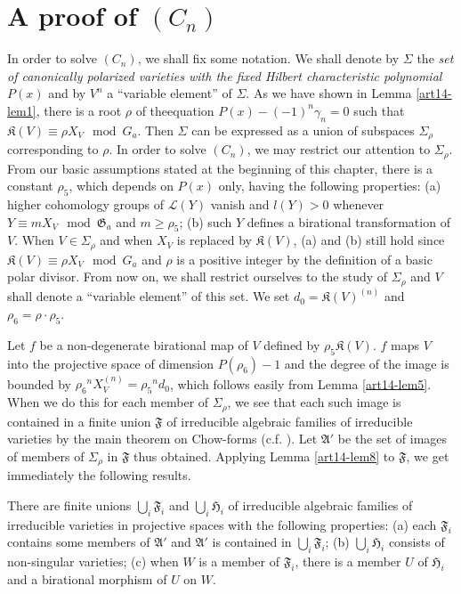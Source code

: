 \section{A proof of $(C_{n})$}\label{art14-sec9}

In order to solve $(C_{n})$, we shall fix some notation. We shall denote by $\Sigma$ the {\em set of canonically polarized varieties with the fixed Hilbert characteristic polynomial} $P(x)$ and by $V^{n}$ a ``variable element'' of $\Sigma$. As we have shown in Lemma \ref{art14-lem1}, there is a root $\rho$ of the\pageoriginale equation $P(x)-(-1)^{n}\gamma_{n}=0$ such that $\mathfrak{K}(V)\equiv \rho X_{V}\mod G_{a}$. Then $\Sigma$ can be expressed as a union of subspaces $\Sigma_{\rho}$ corresponding to $\rho$. In order to solve $(C_{n})$, we may restrict our attention to $\Sigma_{\rho}$. From our basic assumptions stated at the beginning of this chapter, there is a constant $\rho_{5}$, which depends on $P(x)$ only, having the following properties: (a) higher cohomology groups of $\mathscr{L}(Y)$ vanish and $l(Y)>0$ whenever $Y\equiv mX_{V}\mod \mathfrak{G}_{a}$ and $m\geq \rho_{5}$; (b) such $Y$ defines a birational transformation of $V$. When $V\in \Sigma_{\rho}$ and when $X_{V}$ is replaced by $\mathfrak{K}(V)$, (a) and (b) still hold since $\mathfrak{K}(V)\equiv\rho X_{V}\mod G_{a}$ and $\rho$ is a positive integer by the definition of a basic polar divisor. From now on, we shall restrict ourselves to the study of $\Sigma_{\rho}$ and $V$ shall denote a ``variable element'' of this set. We set $d_{0}=\mathfrak{K}(V)^{(n)}$ and $\rho_{6}=\rho\cdot \rho_{5}$.

Let $f$ be a non-degenerate birational map of $V$ defined by $\rho_{5}\mathfrak{K}(V)$. $f$ maps $V$ into the projective space of dimension $P(\rho_{6})-1$ and the degree of the image is bounded by $\rho_{6}{}^{n}X_{V}^{(n)}=\rho_{5}{}^{n}d_{0}$, which follows easily from Lemma \ref{art14-lem5}. When we do this for each member of $\Sigma_{\rho}$, we see that each such image is contained in a finite union $\mathfrak{F}$ of irreducible algebraic families of irreducible varieties by the main theorem on Chow-forms (c.f. \cite{art14-key3}). Let $\mathfrak{A}'$ be the set of images of members of $\Sigma_{\rho}$ in $\mathfrak{F}$ thus obtained. Applying Lemma \ref{art14-lem8} to $\mathfrak{F}$, we get immediately the following results.

\begin{lemma}\label{art14-lem15}
There are finite unions $\bigcup_{i}\mathfrak{F}_{i}$ and $\bigcup_{i}\mathfrak{H}_{i}$ of irreducible algebraic families of irreducible varieties in projective spaces with the following properties: {\rm(a)} each $\mathfrak{F}_{i}$ contains some members of $\mathfrak{A}'$ and $\mathfrak{A}'$ is contained in $\bigcup_{i}\mathfrak{F}_{i}$; {\rm(b)} $\bigcup_{i}\mathfrak{H}_{i}$ consists of non-singular varieties; {\rm(c)} when $W$ is a member of $\mathfrak{F}_{i}$, there is a member $U$ of $\mathfrak{H}_{i}$ and a birational morphism of $U$ on $W$.
\end{lemma}

